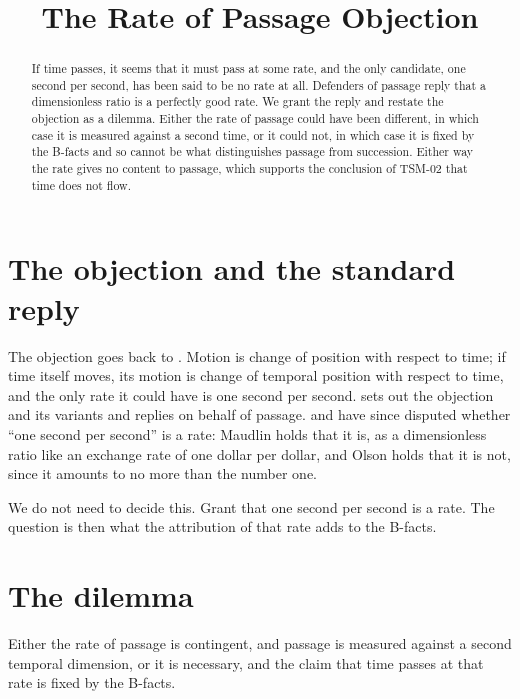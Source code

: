 \documentclass{situationist-preprint}
\title{The Rate of Passage Objection}
\begin{document}
\maketitle

\begin{abstract}
If time passes, it seems that it must pass at some rate, and the only candidate, one second per second, has been said to be no rate at all. Defenders of passage reply that a dimensionless ratio is a perfectly good rate. We grant the reply and restate the objection as a dilemma. Either the rate of passage could have been different, in which case it is measured against a second time, or it could not, in which case it is fixed by the B-facts and so cannot be what distinguishes passage from succession. Either way the rate gives no content to passage, which supports the conclusion of TSM-02 that time does not flow.
\end{abstract}

\section{The objection and the standard reply}

The objection goes back to \citet{Smart1949}. Motion is change of position with respect to time; if time itself moves, its motion is change of temporal position with respect to time, and the only rate it could have is one second per second. \citet{Markosian1993} sets out the objection and its variants and replies on behalf of passage. \citet{Maudlin2007} and \citet{Olson2009} have since disputed whether \enquote{one second per second} is a rate: Maudlin holds that it is, as a dimensionless ratio like an exchange rate of one dollar per dollar, and Olson holds that it is not, since it amounts to no more than the number one.

We do not need to decide this. Grant that one second per second is a rate. The question is then what the attribution of that rate adds to the B-facts.

\section{The dilemma}

\begin{proposition}\label{p:dilemma}
Either the rate of passage is contingent, and passage is measured against a second temporal dimension, or it is necessary, and the claim that time passes at that rate is fixed by the B-facts.
\end{proposition}
\end{document}
